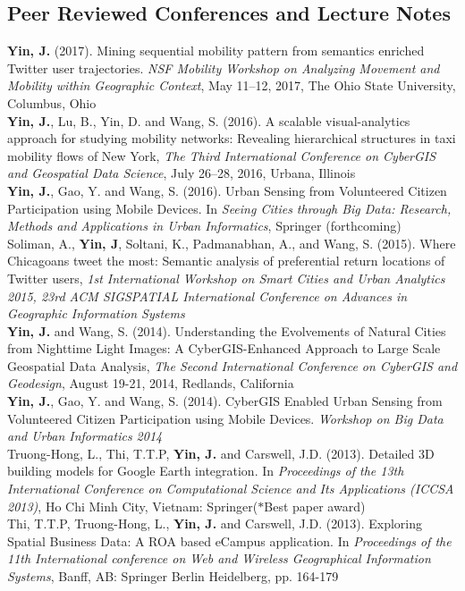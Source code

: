 \documentclass[11pt, a4paper]{article}
\newcommand{\years}[1]{\marginnote{\scriptsize #1}}
\begin{document}
\subsection*{Peer Reviewed Conferences and Lecture Notes}
\noindent
\years{2017}\textbf{Yin, J.} (2017). Mining sequential mobility pattern from semantics enriched Twitter user trajectories. \textit{NSF Mobility Workshop on Analyzing Movement and Mobility within Geographic Context}, May 11–12, 2017, The Ohio State University, Columbus, Ohio\\
\years{2016}\textbf{Yin, J.}, Lu, B., Yin, D. and Wang, S. (2016). A scalable visual-analytics approach for studying mobility networks: Revealing hierarchical structures in taxi mobility flows of New York, \textit{The Third International Conference on CyberGIS and Geospatial Data Science}, July 26–28, 2016, Urbana, Illinois\\
\years{2016}\textbf{Yin, J.}, Gao, Y. and Wang, S. (2016). Urban Sensing from Volunteered Citizen Participation using Mobile Devices. In \emph{Seeing Cities through Big Data: Research, Methods and Applications in Urban Informatics}, Springer (forthcoming)\\
\years{2015}Soliman, A., \textbf{Yin, J}, Soltani, K., Padmanabhan, A., and Wang, S. (2015). Where Chicagoans tweet the most: Semantic analysis of preferential return locations of Twitter users, \emph{1st International Workshop on Smart Cities and Urban Analytics 2015, 23rd ACM SIGSPATIAL International Conference on Advances in Geographic Information Systems}\\ 
\years{2014}\textbf{Yin, J.} and Wang, S. (2014). Understanding the Evolvements of Natural Cities from Nighttime Light Images: A CyberGIS-Enhanced Approach to Large Scale Geospatial Data Analysis, \textit{The Second International Conference on CyberGIS and Geodesign}, August 19-21, 2014, Redlands, California\\
\years{2014}\textbf{Yin, J.}, Gao, Y. and Wang, S. (2014). CyberGIS Enabled Urban Sensing from Volunteered Citizen Participation using Mobile Devices. \emph{Workshop on Big Data and Urban Informatics 2014}\\
\years{2013}Truong-Hong, L., Thi, T.T.P, \textbf{Yin, J.} and Carswell, J.D. (2013). Detailed 3D building models for Google Earth integration. In \emph{Proceedings of the 13th International Conference on Computational Science and Its Applications (ICCSA 2013)}, Ho Chi Minh City, Vietnam: Springer($*$Best paper award)\\
\years{2013}Thi, T.T.P, Truong-Hong, L., \textbf{Yin, J.} and Carswell, J.D. (2013). Exploring Spatial Business Data: A ROA based eCampus application. In \emph{Proceedings of the 11th International conference on Web and Wireless Geographical Information Systems}, Banff, AB: Springer Berlin Heidelberg, pp. 164-179\\
\end{document}
